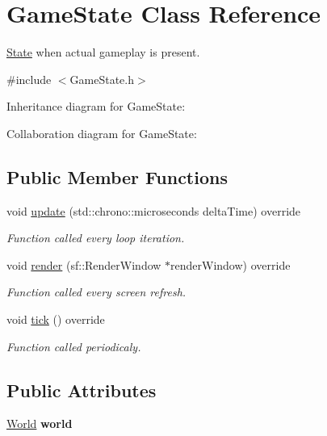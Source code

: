 \hypertarget{classGameState}{\section{Game\-State Class Reference}
\label{classGameState}
}


\hyperlink{classState}{State} when actual gameplay is present.  




{\ttfamily \#include $<$Game\-State.\-h$>$}



Inheritance diagram for Game\-State\-:


Collaboration diagram for Game\-State\-:
\subsection*{Public Member Functions}
\begin{DoxyCompactItemize}
\item 
void \hyperlink{classGameState_aba059d7ab1a53b8f5d795292ed37abac}{update} (std\-::chrono\-::microseconds delta\-Time) override
\begin{DoxyCompactList}\small\item\em Function called every loop iteration. \end{DoxyCompactList}\item 
void \hyperlink{classGameState_acdfc29603b6075750555fba6ee216907}{render} (sf\-::\-Render\-Window $\ast$render\-Window) override
\begin{DoxyCompactList}\small\item\em Function called every screen refresh. \end{DoxyCompactList}\item 
void \hyperlink{classGameState_ae9ff24d75f36ef56daa6a180d4b38a09}{tick} () override
\begin{DoxyCompactList}\small\item\em Function called periodicaly. \end{DoxyCompactList}\end{DoxyCompactItemize}
\subsection*{Public Attributes}
\begin{DoxyCompactItemize}
\item 
\hypertarget{classGameState_af66643f9b3f275979f489f4bc91a3ad4}{\hyperlink{classWorld}{World} {\bfseries world}}\label{classGameState_af66643f9b3f275979f489f4bc91a3ad4}

\end{DoxyCompactItemize}


